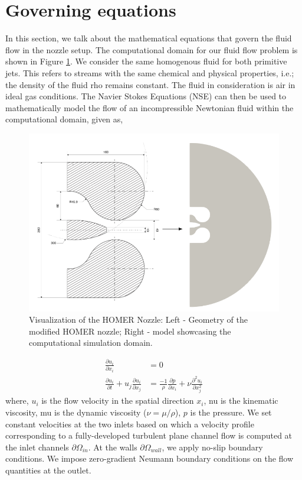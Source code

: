 \section{Governing equations} \label{goveq}
In this section, we talk about the mathematical equations that govern the fluid flow in the nozzle setup. The computational domain for our fluid flow problem is shown in Figure \ref{fig:Domain}. We consider the same homogenous fluid for both primitive jets. This refers to streams with the same chemical and physical properties, i.e.; the density of the fluid \gls{rho} remains constant. The fluid in consideration is air in ideal gas conditions. The Navier Stokes Equations (NSE) can then be used to mathematically model the flow of an incompressible Newtonian fluid within the computational domain, given as, 
\begin{figure}[ht]
  \centering
  \includegraphics[width=12cm]{images/Theory-CFD/Flow Domain.png}
  \caption{Visualization of the HOMER Nozzle: Left - Geometry of the modified HOMER nozzle; Right -  model showcasing the computational simulation domain.}
  \label{fig:Domain}
\end{figure}
\begin{equation}
  \begin{aligned}
  \frac{\partial u_i}{\partial x_i}&=0\\
  \frac{\partial u_i}{\partial t}+u_j \frac{\partial u_i}{\partial x_j}&=\frac{-1}{\rho} \frac{\partial p}{\partial x_i}+\nu \frac{\partial^2 u_i}{\partial x_j^2}
  \end{aligned}
  \end{equation}
where, $u_i$ is the flow velocity in the spatial direction $x_i$, \gls{nu} is the kinematic viscosity, \gls{mu} is the dynamic viscosity ($\nu = \mu / \rho$), $p$ is the pressure. We set constant velocities at the two inlets based on which a velocity profile corresponding to a fully-developed turbulent plane channel flow is computed at the inlet channels $\partial{\Omega_{in}}$. At the walls $\partial{\Omega_{wall}}$, we apply no-slip boundary conditions. We impose zero-gradient Neumann boundary conditions on the flow quantities at the outlet.\\
